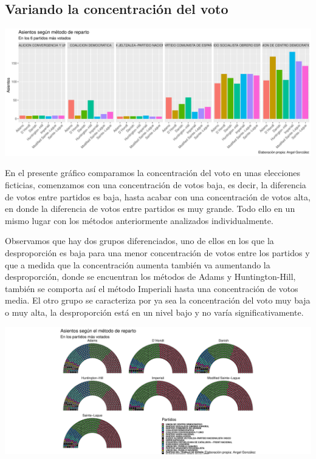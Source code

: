 \documentclass[12pt,a4paper,]{book}
\numberwithin{dummy}{section}
\theoremstyle{ocrenumbox}
\theoremstyle{blacknumex}
\theoremstyle{blacknumbox}
\theoremstyle{ocrenum}
\theoremstyle{ocrenum}
\begin{document}
\hypertarget{variando-la-concentraciuxf3n-del-voto}{%
\subsection{Variando la concentración del
voto}\label{variando-la-concentraciuxf3n-del-voto}}

\begin{center}\includegraphics[width=0.95\linewidth]{figurasR/unnamed-chunk-68-1} \end{center}

En el presente gráfico comparamos la concentración del voto en unas
elecciones ficticias, comenzamos con una concentración de votos baja, es
decir, la diferencia de votos entre partidos es baja, hasta acabar con
una concentración de votos alta, en donde la diferencia de votos entre
partidos es muy grande. Todo ello en un mismo lugar con los métodos
anteriormente analizados individualmente.

Observamos que hay dos grupos diferenciados, uno de ellos en los que la
desproporción es baja para una menor concentración de votos entre los
partidos y que a medida que la concentración aumenta también va
aumentando la desproporción, donde se encuentran los métodos de Adams y
Huntington-Hill, también se comporta así el método Imperiali hasta una
concentración de votos media. El otro grupo se caracteriza por ya sea la
concentración del voto muy baja o muy alta, la desproporción está en un
nivel bajo y no varía significativamente.

\begin{center}\includegraphics[width=0.95\linewidth]{figurasR/unnamed-chunk-69-1} \end{center}
\end{document}
